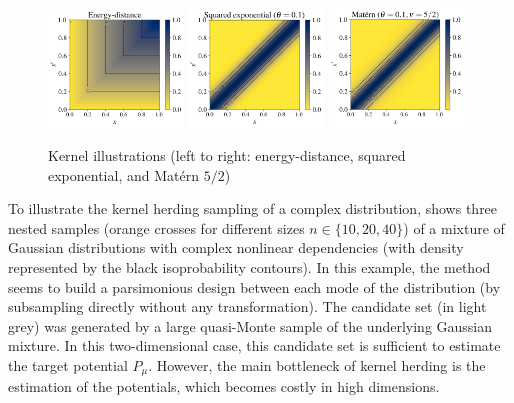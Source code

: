 \begin{figure}[!h]
\begin{center}
    \includegraphics[width=0.32\textwidth]{part2/figures/DCE/numerical_experiments/energy_kernel.jpg}
    \includegraphics[width=0.32\textwidth]{part2/figures/DCE/numerical_experiments/gaussian_kernel.jpg}
    \includegraphics[width=0.32\textwidth]{part2/figures/DCE/numerical_experiments/matern_kernel.jpg}
\end{center}
\caption{Kernel illustrations (left to right: energy-distance, squared exponential, and Matérn $5/2$)} \label{fig:kernels}
\end{figure}

To illustrate the kernel herding sampling of a complex distribution,  shows three nested samples (orange crosses for different sizes $n\in\{10, 20, 40\}$) of a mixture of Gaussian distributions with complex nonlinear dependencies (with density represented by the black isoprobability contours). 
In this example, the method seems to build a parsimonious design between each mode of the distribution (by subsampling directly without any transformation). 
The candidate set (in light grey) was generated by a large quasi-Monte sample of the underlying Gaussian mixture. 
In this two-dimensional case, this candidate set is sufficient to estimate the target potential $P_{\mu}$. 
However, the main bottleneck of kernel herding is the estimation of the potentials, which becomes costly in high dimensions.

